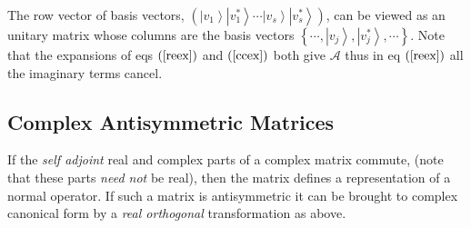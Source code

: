 \documentclass[aps,preprint]{revtex4}%
\begin{document}
The row vector of basis vectors, $\left(  \left\vert v_{1}\right\rangle
\left\vert v_{1}^{\ast}\right\rangle \cdots\left\vert v_{s}\right\rangle
\left\vert v_{s}^{\ast}\right\rangle \right)  $, can be viewed as an unitary
matrix whose columns are the basis vectors $\left\{  \cdots,\left\vert
v_{j}\right\rangle ,\left\vert v_{j}^{\ast}\right\rangle ,\cdots\right\}  $.
Note that the expansions of eqs $\left(  \ref{reex}\right)  $ and $\left(
\ref{ccex}\right)  $ both give $\mathcal{A}$ thus in eq $\left(
\ref{reex}\right)  $ all the imaginary terms cancel.

\subsection{Complex Antisymmetric Matrices}

If the \emph{self adjoint} real and complex parts of a complex matrix commute,
(note that these parts \emph{need not }be real), then the matrix defines a
representation of a normal operator. If such a matrix is antisymmetric it can
be brought to complex canonical form by a \emph{real orthogonal}
transformation as above.
\end{document}
